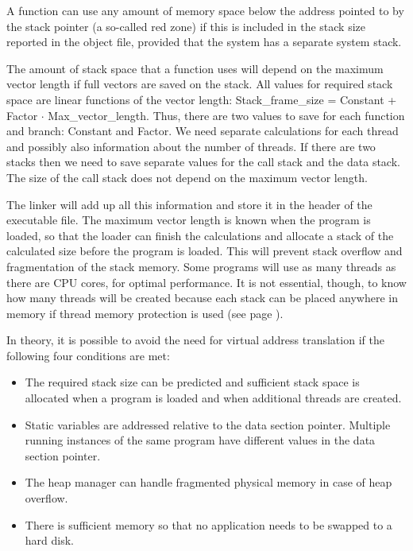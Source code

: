 \documentclass[forwardcom.tex]{subfiles}
\begin{document}
A function can use any amount of memory space below the address pointed to by the stack pointer (a so-called red zone) if this is included in the stack size reported in the object file, provided that the system has a separate system stack. 
\vspace{2mm}

The amount of stack space that a function uses will depend on the maximum vector length if full vectors are saved on the stack. All values for required stack space are linear functions of the vector length: Stack\_frame\_size = Constant + Factor $\cdot$ Max\_vector\_length. Thus, there are two values to save for each function and branch: Constant and Factor. We need separate calculations for each thread and possibly also information about the number of threads. If there are two stacks then we need to save separate values for the call stack and the data stack. The size of the call stack does not depend on the maximum vector length. 
\vspace{2mm}

The linker will add up all this information and store it in the header of the executable file. The maximum vector length is known when the program is loaded, so that the loader can finish the calculations and allocate a stack of the calculated size before the program is loaded. This will prevent stack overflow and fragmentation of the stack memory. Some programs will use as many threads as there are CPU cores, for optimal performance. It is not essential, though, to know how many threads will be created because each stack can be placed anywhere in memory if thread memory protection is used (see page \pageref{threadMemoryProtection}). 
\vspace{2mm}

In theory, it is possible to avoid the need for virtual address translation if the following four conditions are met: 

\begin{itemize}
\item The required stack size can be predicted and sufficient stack space is allocated when a 
program is loaded and when additional threads are created. 

\item Static variables are addressed relative to the data section pointer. Multiple running instances of the same program have different values in the data section pointer. 

\item The heap manager can handle fragmented physical memory in case of heap overflow. 

\item There is sufficient memory so that no application needs to be swapped to a hard disk.
\end{itemize}
\end{document}
